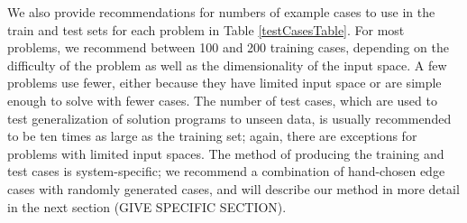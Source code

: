 \documentclass{sig-alternate}
\begin{document}
We also provide recommendations for numbers of example cases to use in the train and test sets for each problem in Table \ref{testCasesTable}. For most problems, we recommend between 100 and 200 training cases, depending on the difficulty of the problem as well as the dimensionality of the input space. A few problems use fewer, either because they have limited input space or are simple enough to solve with fewer cases. The number of test cases, which are used to test generalization of solution programs to unseen data, is usually recommended to be ten times as large as the training set; again, there are exceptions for problems with limited input spaces. The method of producing the training and test cases is system-specific; we recommend a combination of hand-chosen edge cases with randomly generated cases, and will describe our method in more detail in the next section (GIVE SPECIFIC SECTION).
\end{document}
